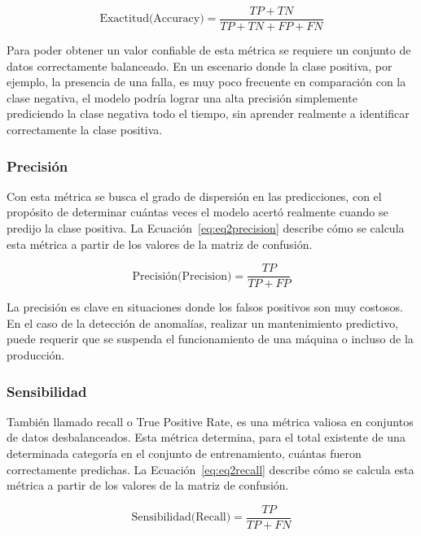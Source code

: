 \documentclass[11pt,a4paper,spanish]{book}
\numberwithin{equation}{chapter}
\numberwithin{figure}{chapter}
\begin{document}
\begin{equation}\label{eq:eq2accuracy}
\text{Exactitud(Accuracy)} = \frac{TP + TN}{TP + TN + FP + FN}
\end{equation}

Para poder obtener un valor confiable de esta métrica se requiere un conjunto de datos 
correctamente balanceado.  En un escenario donde la clase positiva, por ejemplo, la 
presencia de una falla, es muy poco frecuente en comparación con la clase negativa, el 
modelo podría lograr una alta precisión simplemente prediciendo la clase negativa todo 
el tiempo, sin aprender realmente a identificar correctamente la clase positiva.

\subsubsection{Precisión}

Con esta métrica se busca el grado de dispersión en las predicciones, con el propósito 
de determinar cuántas veces el modelo acertó realmente cuando se predijo la clase 
positiva. La Ecuación~\eqref{eq:eq2precision} describe cómo se calcula esta métrica a 
partir de los valores de la matriz de confusión. 

\begin{equation}\label{eq:eq2precision}
\text{Precisión(Precision)} = \frac{TP}{TP + FP}
\end{equation}

La precisión es clave en situaciones donde los falsos positivos son muy costosos. En el 
caso de la detección de anomalías, realizar un mantenimiento predictivo, puede requerir 
que se suspenda el funcionamiento de una máquina o incluso de la producción. 


\subsubsection{Sensibilidad}

También llamado recall o True Positive Rate, es una métrica valiosa en conjuntos de 
datos desbalanceados. Esta métrica determina, para el total existente de una determinada 
categoría en el conjunto de entrenamiento, cuántas fueron correctamente predichas. La 
Ecuación~\eqref{eq:eq2recall} describe cómo se calcula esta métrica a partir de los 
valores de la matriz de confusión. 

\begin{equation}\label{eq:eq2recall}
\text{Sensibilidad(Recall)} = \frac{TP}{TP + FN}
\end{equation}
\end{document}

